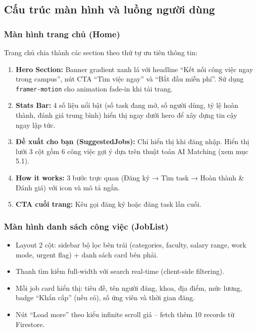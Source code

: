 \subsection{Cấu trúc màn hình và luồng người dùng}

\subsubsection{Màn hình trang chủ (Home)}

Trang chủ chia thành các section theo thứ tự ưu tiên thông tin:

\begin{enumerate}
  \item \textbf{Hero Section:} Banner gradient xanh lá với headline ``Kết nối công việc ngay
    trong campus'', nút CTA ``Tìm việc ngay'' và ``Bắt đầu miễn phí''. Sử dụng
    \texttt{framer-motion} cho animation fade-in khi tải trang.

  \item \textbf{Stats Bar:} 4 số liệu nổi bật (số task đang mở, số người dùng, tỷ lệ hoàn
    thành, đánh giá trung bình) hiển thị ngay dưới hero để xây dựng tin cậy ngay lập tức.

  \item \textbf{Đề xuất cho bạn (SuggestedJobs):} Chỉ hiển thị khi đăng nhập. Hiển thị
    lưới 3 cột gồm 6 công việc gợi ý dựa trên thuật toán AI Matching (xem mục 5.1).

  \item \textbf{How it works:} 3 bước trực quan (Đăng ký → Tìm task → Hoàn thành \&
    Đánh giá) với icon và mô tả ngắn.

  \item \textbf{CTA cuối trang:} Kêu gọi đăng ký hoặc đăng task lần cuối.
\end{enumerate}

\subsubsection{Màn hình danh sách công việc (JobList)}

\begin{itemize}
  \item Layout 2 cột: sidebar bộ lọc bên trái (categories, faculty, salary range, work mode,
    urgent flag) + danh sách card bên phải.
  \item Thanh tìm kiếm full-width với search real-time (client-side filtering).
  \item Mỗi job card hiển thị: tiêu đề, tên người đăng, khoa, địa điểm, mức lương,
    badge ``Khẩn cấp'' (nếu có), số ứng viên và thời gian đăng.
  \item Nút ``Load more'' theo kiểu infinite scroll giả -- fetch thêm 10 records từ Firestore.
\end{itemize}


